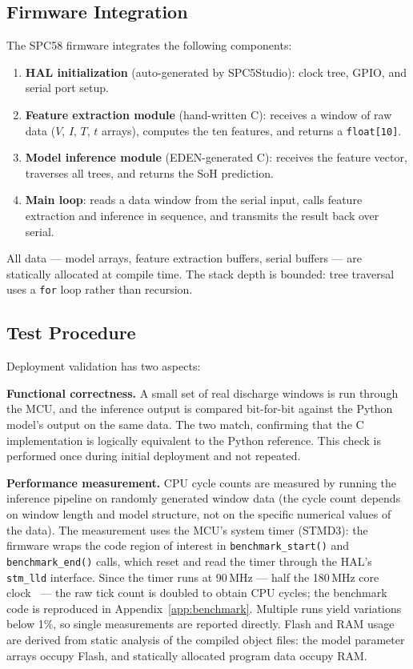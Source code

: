 \subsection{Firmware Integration}

The SPC58 firmware integrates the following components:

\begin{enumerate}
    \item \textbf{HAL initialization} (auto-generated by SPC5Studio): clock tree, GPIO, and serial port setup.
    \item \textbf{Feature extraction module} (hand-written C): receives a window of raw data ($V$, $I$, $T$, $t$ arrays), computes the ten features, and returns a \texttt{float[10]}.
    \item \textbf{Model inference module} (EDEN-generated C): receives the feature vector, traverses all trees, and returns the SoH prediction.
    \item \textbf{Main loop}: reads a data window from the serial input, calls feature extraction and inference in sequence, and transmits the result back over serial.
\end{enumerate}

All data --- model arrays, feature extraction buffers, serial buffers --- are statically allocated at compile time. The stack depth is bounded: tree traversal uses a \texttt{for} loop rather than recursion.

\subsection{Test Procedure}

Deployment validation has two aspects:

\textbf{Functional correctness.} A small set of real discharge windows is run through the MCU, and the inference output is compared bit-for-bit against the Python model's output on the same data. The two match, confirming that the C implementation is logically equivalent to the Python reference. This check is performed once during initial deployment and not repeated.

\textbf{Performance measurement.} CPU cycle counts are measured by running the inference pipeline on randomly generated window data (the cycle count depends on window length and model structure, not on the specific numerical values of the data). The measurement uses the MCU's system timer (STMD3): the firmware wraps the code region of interest in \texttt{benchmark\_start()} and \texttt{benchmark\_end()} calls, which reset and read the timer through the HAL's \texttt{stm\_lld} interface. Since the timer runs at 90\,MHz --- half the 180\,MHz core clock~\autocite{spc58ec80e5_ds} --- the raw tick count is doubled to obtain CPU cycles; the benchmark code is reproduced in Appendix~\ref{app:benchmark}. Multiple runs yield variations below 1\%, so single measurements are reported directly. Flash and RAM usage are derived from static analysis of the compiled object files: the model parameter arrays occupy Flash, and statically allocated program data occupy RAM.


